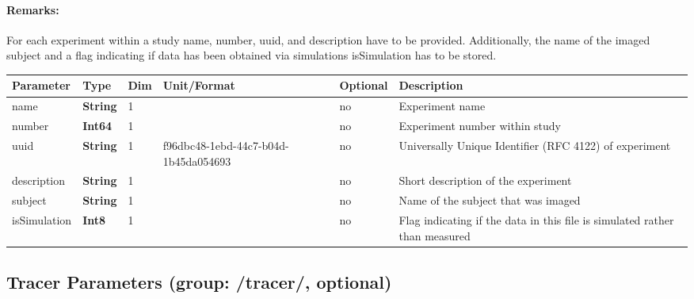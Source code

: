 \documentclass[landscape,a4paper]{article} %
\newcommand{\inltab}[1]{{\ttfamily\bfseries\color{blue}#1}}
\newcommand{\inlvar}[1]{{\ttfamily#1}}
\begin{document}
\begin{multicols}{2}
\paragraph{Remarks:} For each experiment within a study \inlvar{name}, \inlvar{number}, \inlvar{uuid}, and \inlvar{description} have to be provided. Additionally, the name of the imaged \inlvar{subject} and a flag indicating if data has been obtained via simulations \inlvar{isSimulation} has to be stored.
\end{multicols}

\noindent \begin{tabularx}{\columnwidth}{lllllX} 
\textbf{Parameter} & \textbf{Type} & \textbf{Dim} & \textbf{Unit/Format} & \textbf{Optional} & \textbf{Description} \\ \hline 
\inlvar{name} & \inltab{String} & 1 & & no & Experiment name \\ \hline
\inlvar{number} & \inltab{Int64} & 1 & & no & Experiment number within study\\ \hline
\inlvar{uuid} & \inltab{String} & 1 & f96dbc48-1ebd-44c7-b04d-1b45da054693 & no & Universally Unique Identifier (RFC 4122) of experiment \\ \hline 
\inlvar{description} & \inltab{String} & 1 & & no & Short description of the experiment \\ \hline
\inlvar{subject} & \inltab{String} & 1 & & no & Name of the subject that was imaged \\ \hline 
\inlvar{isSimulation} & \inltab{Int8} & 1 & & no & Flag indicating if the data in this file is simulated rather than measured \\ \hline
\end{tabularx}


\subsection{Tracer Parameters (group: \inlvar{/tracer/}, optional)}
\end{document}
